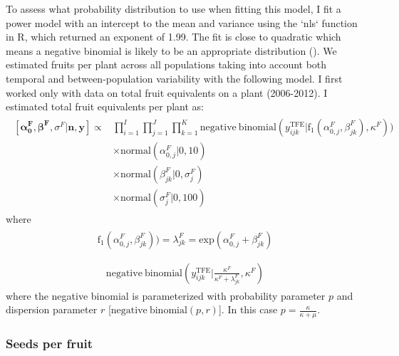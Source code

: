 \documentclass[12pt, oneside, titlepage]{article}   	%
\begin{document}
To assess what probability distribution to use when fitting this model, I fit a power model with an intercept to the mean and variance using the `nls` function in R, which returned an exponent of 1.99. The fit is close to quadratic which means a negative binomial is likely to be an appropriate distribution (\cite{linden2011}). We estimated fruits per plant across all populations taking into account both temporal and between-population variability with the following model. I first worked only with data on total fruit equivalents on a plant (2006-2012). I estimated total fruit equivalents per plant as: 
%
\begin{align}
  \begin{split}
 [ \bm{\alpha^F_0}, \bm{\beta^F}, \sigma^F | \bm{n}, \bm{y} ] \propto 
 & \prod_{i=1}^{I} \prod_{j=1}^{J} \prod_{k=1}^{K}  \mathrm{negative \ binomial} ( y^{\mathrm{TFE}}_{ijk} | \mathrm{f}_1(\alpha^F_{0,j} , \beta^F_{jk} ),  \kappa^F ) )
     \\ & \times \mathrm{normal} ( \alpha^F_{0,j} | 0, 10) 
     \\ & \times \mathrm{normal} ( \beta^F_{jk} | 0, \sigma^F_j) 
    \\ & \times \mathrm{normal} ( \sigma^F_j | 0, 100)  
   \end{split}
\end{align}
%
where
%
\begin{align}
  \begin{split}
\mathrm{f}_1(\alpha^F_{0,j} , \beta^F_{jk} ) ) = \lambda^F_{jk} = \mathrm{exp}( \alpha^F_{0,j} + \beta^F_{jk} ) \\
  \end{split}
\end{align}
%
\begin{align}
  \begin{split}
  \mathrm{negative \ binomial} ( y^{\mathrm{TFE}}_{ijk} | \frac{\kappa^F}{\kappa^F + \lambda^F_{jk}} ,  \kappa^F )
  \end{split}
\end{align}
%
where the negative binomial is parameterized with probability parameter $p$ and dispersion parameter $r$ [$ \mathrm{negative \ binomial}(p,r)$]. In this case $p=\frac{\kappa}{\kappa+\mu}$.

\subsubsection*{Seeds per fruit}
\end{document}
